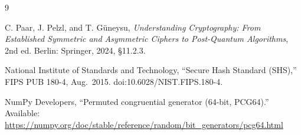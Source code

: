 \documentclass[12pt,letterpaper]{article}
\begin{document}
\newpage 


\begin{thebibliography}{9}

C. Paar, J. Pelzl, and T. G\"uneysu, \emph{Understanding Cryptography: From Established Symmetric and Asymmetric Ciphers to Post-Quantum Algorithms}, 2nd ed. Berlin: Springer, 2024, \S11.2.3.

National Institute of Standards and Technology, ``Secure Hash Standard (SHS),'' FIPS PUB 180-4, Aug.~2015. doi:10.6028/NIST.FIPS.180-4.

NumPy Developers, ``Permuted congruential generator (64-bit, PCG64).'' Available: \url{https://numpy.org/doc/stable/reference/random/bit_generators/pcg64.html}

\end{thebibliography}
\end{document}
